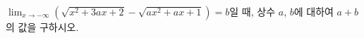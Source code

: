 $\displaystyle\lim_{x\to -\infty}(\sqrt{x^2+3ax+2}-\sqrt{ax^2+ax+1})=b$일 때, 상수 $a$, $b$에 대하여 $a+b$의 값을 구하시오.
